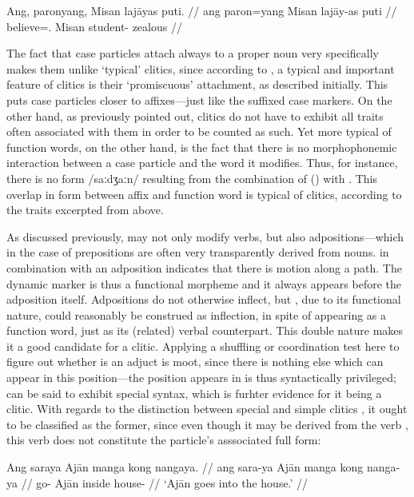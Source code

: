 \a\label{ex:clitics_11b}\ljudge{*}\begingl
	\gla Ang, paronyang, Misan lajāyas puti. //
	\glb ang paron=yang Misan lajāy-as puti //
	\glc \Aarg{} believe=\Fsg{}.\Aarg{} Misan student-\Parg{} zealous //
\endgl
\xe

The fact that case particles attach always to a proper noun very specifically
makes them unlike `typical' clitics, since according to
\citet{spencerluis2012}, a typical and important feature of clitics is their
`promiscuous' attachment, as described initially. This puts case particles
closer to affixes---just like the suffixed case markers. On the other hand, as
previously pointed out, clitics do not have to exhibit all traits often
associated with them in order to be counted as such. Yet more typical of
function words, on the other hand, is the fact that there is no morphophonemic
interaction between a case particle and the word it modifies. Thus, for
instance, there is no form /saːdʒaːn/ resulting from the combination of
 (\Parg{}) with . This overlap in form between
affix and function word is typical of clitics, according to the traits
excerpted from \citet{spencerluis2012} above.

\label{clitics_prep_dyn}
As discussed previously,  may not only modify verbs, but also
ad\-posi\-tions---which in the case of prepositions are often very
transparently derived from nouns.  in combination with an
adposition  indicates that there is motion along a path. The
dynamic marker  is thus a functional morpheme and it always
appears before the adposition itself. Adpositions do not otherwise inflect, but
, due to its functional nature, could reasonably be construed
as inflection, in spite of appearing as a function word, just as its (related)
verbal counterpart. This double nature makes it a good candidate for a clitic.
Applying a shuffling or coordination test here to figure out whether
 is an adjuct is moot, since there is nothing else which can
appear in this position---the position  appears in is thus
syntactically privileged;  can be said to exhibit special
syntax, which is furhter evidence for it being a clitic. With regards to the
distinction between special and simple clitics \citep{zwicky1977}, it ought to
be classified as the former, since even though it may be derived from the verb
, this verb does not constitute the particle's asssociated full
form:

\pex\label{ex:clitics_manga}
\a\label{ex:clitics_manga1}\begingl
	\gla Ang saraya Ajān manga kong nangaya. //
	\glb ang sara-ya Ajān manga kong nanga-ya //
	\glc \AgtT{} go-\TsgM{} Ajān \Dyn{} inside house-\Loc{} //
	\glft `Ajān goes into the house.' //
\endgl

